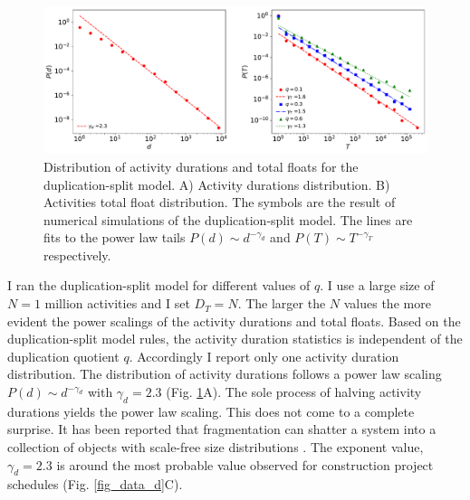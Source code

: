 \documentclass[11pt]{article}
\begin{document}
\begin{figure}[t]
\includegraphics[width=6.3in]{fig_model}
\caption{Distribution of activity durations and total floats for the duplication-split model. A) Activity durations distribution. B) Activities total float distribution. The symbols are the result of numerical simulations of the duplication-split model. The lines are fits to the power law tails $P(d)\sim d^{-\gamma_d}$ and $P(T)\sim T^{-\gamma_T}$ respectively.}
\label{fig_model}
\end{figure}

I ran the duplication-split model for different values of $q$. I use a large size of $N=1$ million activities and I set $D_T=N$. The larger the $N$ values the more evident the power scalings of the activity durations and total floats.  Based on the duplication-split model rules, the activity duration statistics is independent of the duplication quotient $q$. Accordingly I report only one activity duration distribution. The distribution of activity durations follows a power law scaling $P(d)\sim d^{-\gamma_d}$ with $\gamma_d=2.3$ (Fig. \ref{fig_model}A). The sole process of halving activity durations yields the power law scaling. This does not come to a complete surprise. It has been reported that fragmentation can shatter a system into a collection of objects with scale-free size distributions  \cite{krapivsky94,sotolongo96}. The exponent value, $\gamma_d=2.3$ is around the most probable value observed for construction project schedules (Fig. \ref{fig_data_d}C).
\end{document}
